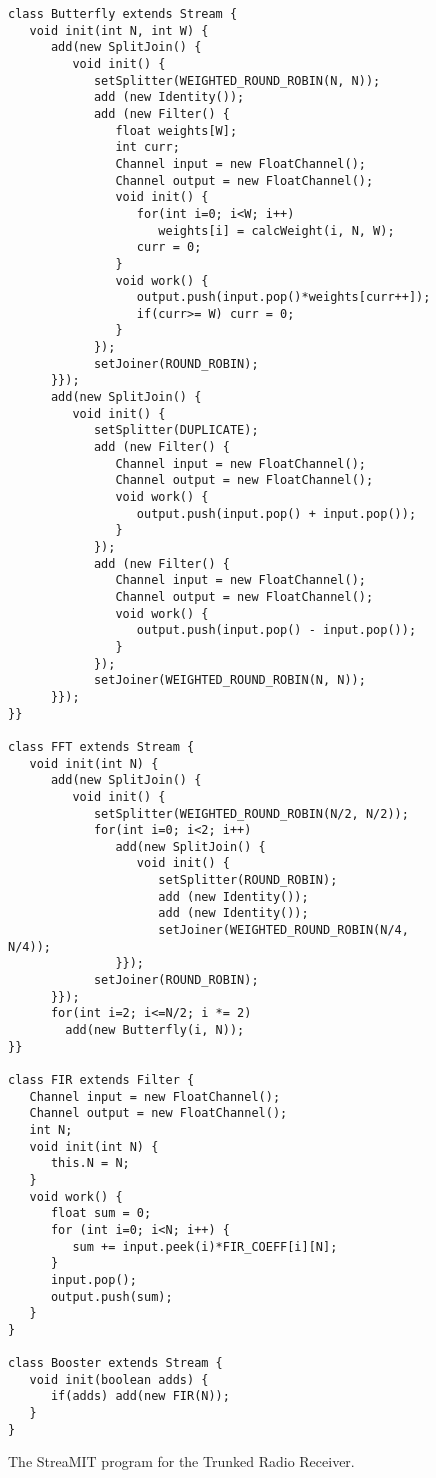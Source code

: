 \clearpage

\begin{figure}[h]
\scriptsize
\begin{verbatim}
class Butterfly extends Stream {
   void init(int N, int W) {
      add(new SplitJoin() {
         void init() {
            setSplitter(WEIGHTED_ROUND_ROBIN(N, N));
            add (new Identity());
            add (new Filter() {
               float weights[W];
               int curr;
               Channel input = new FloatChannel();
               Channel output = new FloatChannel();
               void init() {
                  for(int i=0; i<W; i++)
                     weights[i] = calcWeight(i, N, W);
                  curr = 0;
               }
               void work() {
                  output.push(input.pop()*weights[curr++]);
                  if(curr>= W) curr = 0;
               }    
            });
            setJoiner(ROUND_ROBIN);
      }});
      add(new SplitJoin() {
         void init() {
            setSplitter(DUPLICATE);
            add (new Filter() {   
               Channel input = new FloatChannel();
               Channel output = new FloatChannel();
               void work() {
                  output.push(input.pop() + input.pop());
               }
            });
            add (new Filter() {   
               Channel input = new FloatChannel();
               Channel output = new FloatChannel();
               void work() {
                  output.push(input.pop() - input.pop());
               }
            });
            setJoiner(WEIGHTED_ROUND_ROBIN(N, N));
      }});
}}

class FFT extends Stream {
   void init(int N) {
      add(new SplitJoin() {
         void init() {
            setSplitter(WEIGHTED_ROUND_ROBIN(N/2, N/2));
            for(int i=0; i<2; i++) 
               add(new SplitJoin() {
                  void init() {
                     setSplitter(ROUND_ROBIN);
                     add (new Identity());
                     add (new Identity());
                     setJoiner(WEIGHTED_ROUND_ROBIN(N/4, N/4));
               }});
            setJoiner(ROUND_ROBIN);
      }});
      for(int i=2; i<=N/2; i *= 2)
        add(new Butterfly(i, N));
}}

class FIR extends Filter {
   Channel input = new FloatChannel();
   Channel output = new FloatChannel();           
   int N;
   void init(int N) {
      this.N = N;
   }
   void work() {
      float sum = 0;
      for (int i=0; i<N; i++) {
         sum += input.peek(i)*FIR_COEFF[i][N];
      }
      input.pop();
      output.push(sum);
   }
}

class Booster extends Stream {
   void init(boolean adds) {
      if(adds) add(new FIR(N));
   }
}
\end{verbatim}
\vspace{-12pt}
\caption{\protect\small The StreaMIT program for the Trunked Radio Receiver.
\protect\label{fig:radiocode}}
\vspace{-12pt}
\end{figure}

